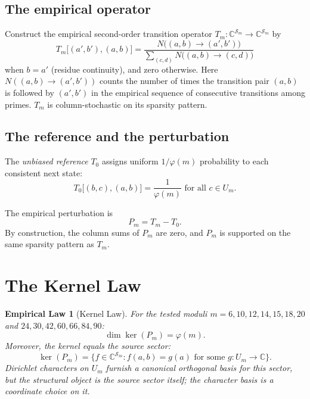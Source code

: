 \documentclass[11pt,a4paper]{article}
\newtheorem*{emplaw}{Empirical Law}
\begin{document}
\subsection{The empirical operator}

Construct the empirical second-order transition operator $T_m : \mathbb{C}^{\mathcal{S}_m} \to \mathbb{C}^{\mathcal{S}_m}$ by
\begin{equation}
T_m\bigl[(a',b'), (a,b)\bigr] = \frac{N\bigl((a,b) \to (a',b')\bigr)}{\sum_{(c,d)} N\bigl((a,b) \to (c,d)\bigr)}
\end{equation}
when $b = a'$ (residue continuity), and zero otherwise. Here $N((a,b) \to (a',b'))$ counts the number of times the transition pair $(a,b)$ is followed by $(a',b')$ in the empirical sequence of consecutive transitions among primes. $T_m$ is column-stochastic on its sparsity pattern.

\subsection{The reference and the perturbation}

The \emph{unbiased reference} $T_0$ assigns uniform $1/\varphi(m)$ probability to each consistent next state:
\begin{equation}
T_0\bigl[(b,c), (a,b)\bigr] = \frac{1}{\varphi(m)} \text{ for all } c \in U_m.
\end{equation}

The empirical perturbation is
\begin{equation}
P_m = T_m - T_0.
\end{equation}
By construction, the column sums of $P_m$ are zero, and $P_m$ is supported on the same sparsity pattern as $T_m$.

\section{The Kernel Law}
\label{sec:kernel}

\begin{emplaw}[Kernel Law]
\label{thm:kernel}
For the tested moduli $m=6,10,12,14,15,18,20$ and $24,30,42,60,66,84,90$:
\begin{equation}
\dim \ker(P_m) = \varphi(m).
\end{equation}
Moreover, the kernel equals the \emph{source sector}:
\begin{equation}
\ker(P_m) = \bigl\{f \in \mathbb{C}^{\mathcal{S}_m} : f(a, b) = g(a) \text{ for some } g : U_m \to \mathbb{C}\bigr\}.
\end{equation}
Dirichlet characters on $U_m$ furnish a canonical orthogonal basis for this sector, but the structural object is the source sector itself; the character basis is a coordinate choice on it.
\end{emplaw}
\end{document}
